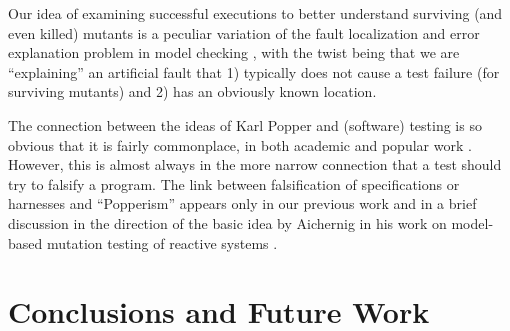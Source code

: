 \documentclass{svjour3}
\begin{document}
Our idea of examining successful executions to better understand
surviving (and even killed) mutants is a peculiar variation of the
fault localization and error explanation problem in model checking
\cite{GroceDist}, with the twist being that we are ``explaining'' an
artificial fault that 1) typically does not cause a test failure (for
surviving mutants) and 2) has an obviously known location.

The connection between the ideas of Karl Popper and (software) testing
is so obvious that it is fairly commonplace, in both academic and
popular work \cite{kaner}.  However, this is almost always in the more
narrow connection that a test should try to falsify a program.  The
link between falsification of specifications or harnesses and
``Popperism'' appears only in our previous work \cite{ase15} and in a
brief discussion in the direction
of the basic idea by Aichernig in his work on model-based mutation testing
of reactive systems \cite{aichernig2013model}.

\section{Conclusions and Future Work}
\end{document}
